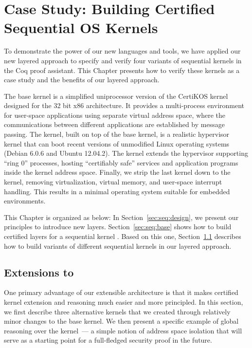 \chapter{Case Study: Building Certified Sequential OS Kernels}
\label{chap:seq:kernel}
To demonstrate the power of our new languages and tools,
we have applied our new layered approach to specify and
verify four variants of sequential \mCTOS{} kernels in the Coq proof assistant.
This Chapter presents how to verify  these kernels as a case study and the benefits of our layered approach.

The \mCTOSbase{} base kernel is a simplified uniprocessor version of
the CertiKOS kernel~\cite{gu11} designed for the 32 bit x86
architecture.  It provides a multi-process environment for user-space
applications using separate virtual address space, where the
communications between different applications are established by
message passing.  The \mCTOShyper{} kernel, built on top of the base
kernel, is a realistic hypervisor kernel that can boot recent versions
of unmodified Linux operating systems (Debian 6.0.6 and Ubuntu
12.04.2).  The \mCTOSringz{} kernel extends the hypervisor supporting
``ring 0'' processes, hosting ``certifiably safe'' services and
application programs inside the kernel address space.  Finally, we
strip the last kernel down to the \mCTOSembed{} kernel, removing
virtualization, virtual memory, and user-space interrupt handling.
This results in a minimal operating system suitable for embedded
environments.

This Chapter is organized as below:
In Section~\ref{sec:seq:design}, we present
our principles to introduce new layers.
Section~\ref{sec:seq:base} shows
how to build certified layers for  a sequential kernel
\mCTOS{}.
Based on this one,
Section~\ref{sec:seq:extend}
describes how to build variants of different sequential
kernels in our layered approach.






\section{Extensions to \mCTOS{}}
\label{sec:seq:extend}

One primary advantage of our extensible architecture is that it makes
certified kernel extension and reasoning much easier and more principled. 
In this section, we first describe three alternative \mCTOSbase{} kernels
that we created through relatively minor changes to the base kernel. We
then present a specific example of global reasoning over the \mCTOSbase{} 
kernel~--- a simple notion of address space isolation that will serve as 
a starting point for a full-fledged security proof in the future.

